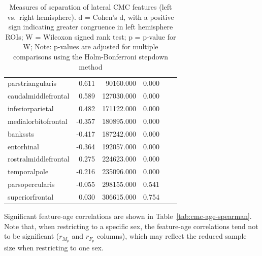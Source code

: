 \documentclass{article}
\begin{document}
\begin{table}
\begin{tabular}{lrrrrr}
	parstriangularis         &  0.611 &  90160.000   & 0.000 \\
	caudalmiddlefrontal      &  0.589 &  127030.000  & 0.000 \\
	inferiorparietal         &  0.482 &  171122.000  & 0.000 \\
	medialorbitofrontal      & -0.357 &  180895.000  & 0.000 \\
	bankssts                 & -0.417 &  187242.000  & 0.000 \\
	entorhinal               & -0.364 &  192057.000  & 0.000 \\
	rostralmiddlefrontal     &  0.275 &  224623.000  & 0.000 \\
	temporalpole             & -0.216 &  235096.000  & 0.000 \\
	parsopercularis          & -0.055 &  298155.000  & 0.541 \\
	superiorfrontal          &  0.030 &  306615.000  & 0.754 \\
	\bottomrule
\end{tabular}
\footnotesize
\caption{Measures of separation of lateral CMC features (left vs.\ right
hemisphere). d = Cohen's d, with a positive sign indicating greater congruence in left hemisphere ROIs;
W = Wilcoxon signed rank test; p = p-value for W;
Note: p-values are adjusted for multiple comparisons using the Holm-Bonferroni stepdown method
} \label{tab:lateral-cmc}
\normalsize
\end{table}


Significant feature-age correlations are shown in Table~\ref{tab:cmc-age-spearman}. Note
that, when restricting to a specific sex, the feature-age correlations tend not to be
significant (\(r_{M_p}\) and \(r_{F_p}\) columns), which may reflect the reduced sample
size when restricting to one sex.
\end{document}
